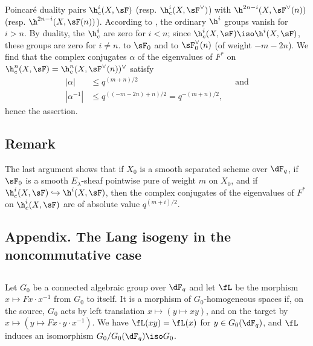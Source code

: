 Poincaré duality pairs $\h_c^i(X,\sF)$ (resp. 
$\h_c^i(X,\sF^\vee)$) with $\h^{2n-i}(X,\sF^\vee(n))$ (resp. 
$\h^{2n-i}(X,\sF(n))$). According to \cite[XIV 3.2]{sga4}, the ordinary $\h^i$ groups 
vanish for $i>n$. By duality, the $\h_c^i$ are zero for $i<n$; since 
$\h_c^i(X,\sF) \iso \h^i(X,\sF)$, these groups are zero for $i\ne n$. 
 to $\sF_0$ and to $\sF_0^\vee(n)$ (of weight 
$-m-2n$). We find that the complex conjugates $\alpha$ of the eigenvalues 
of $F^\ast$ on $\h_c^n(X,\sF) = \h_c^n(X,\sF^\vee(n))^\vee$ satisfy 
\begin{align*}
  |\alpha| &\leqslant q^{(m+n)/2} && \text{and} \\
  |\alpha^{-1}| &\leqslant q^{((-m-2n)+n)/2} = q^{-(m+n)/2} \text{,}
\end{align*}
hence the assertion. 





\subsection{Remark}\label{VI:1-21}

The last argument shows that if $X_0$ is a smooth separated scheme over 
$\dF_q$, if $\sF_0$ is a smooth $E_\lambda$-sheaf pointwise pure of weight 
$m$ on $X_0$, and if $\h_c^i(X,\sF) \hookrightarrow \h^i(X,\sF)$, then the 
complex conjugates of the eigenvalues of $F^\ast$ on $\h_c^i(X,\sF)$ are 
of absolute value $q^{(m+i)/2}$. 





\subsection*{Appendix. The Lang isogeny in the noncommutative case}




\subsection{}\label{VI:1-22}

Let $G_0$ be a connected algebraic group over $\dF_q$ and let $\fL$ be the morphism 
$x\mapsto F x\cdot x^{-1}$ from $G_0$ to itself. It is a morphism of 
$G_0$-homogeneous spaces if, on the source, $G_0$ acts by left translation 
$x\mapsto (y\mapsto x y)$, and on the target by 
$x\mapsto (y\mapsto F x\cdot y\cdot x^{-1})$. We have $\fL(xy) = \fL(x)$ for 
$y\in G_0(\dF_q)$, and $\fL$ induces an isomorphism $G_0/G_0(\dF_q)\iso G_0$. 

